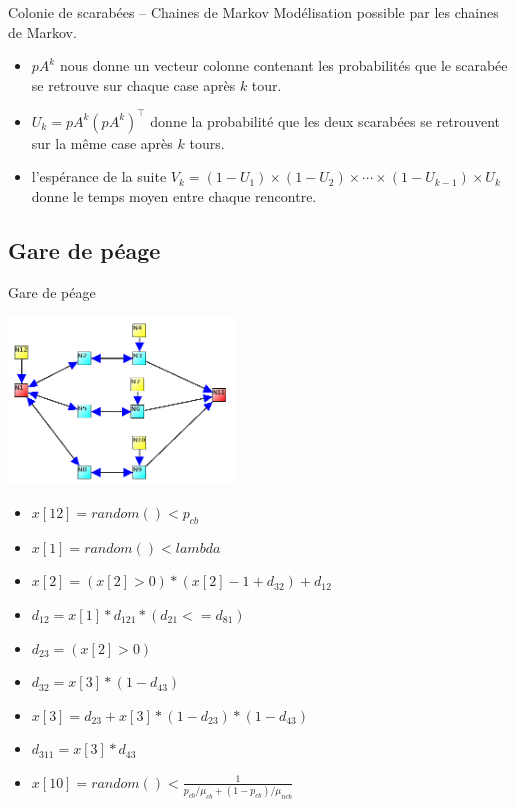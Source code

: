 \documentclass{beamer}
\begin{document}
  \begin{frame}{Colonie de scarabées -- Chaines de Markov}
    Modélisation possible par les chaines de Markov.

    \begin{itemize}
        \item $pA^k$ nous donne un vecteur colonne contenant les probabilités que le scarabée
            se retrouve sur chaque case après $k$ tour.
        \item $U_k = pA^k(pA^k)^\intercal$ donne la probabilité que les deux scarabées se retrouvent
            sur la même case après $k$ tours.
        \item l'espérance de la suite $V_k = (1 - U_1) \times (1 - U_2) \times \cdots \times (1 - U_{k - 1}) \times U_k$ donne le temps moyen entre chaque rencontre.
    \end{itemize}
  \end{frame}

\subsection{Gare de péage}
  \begin{frame}{Gare de péage}
    \begin{vwcol}[widths={0.6,0.4}, sep=.0cm, rule=0pt] 
      \includegraphics[width=6cm]{../../procstochs/img/3_files.png}

      \tiny
      \begin{itemize}
        \item $x[12] = random() < p_{cb}$
        \item $x[1] = random() < lambda$
        \item $x[2] =(x[2]>0)*(x[2]-1+d_{32})+d_{12}$
        \item $d_{12} = x[1]*d_{121}*(d_{21}<=d_{81})$
        \item $d_{23} = (x[2]>0)$
        \item $d_{32} = x[3]*(1-d_{43})$
        \item $x[3] = d_{23} + x[3]*(1-d_{23})*(1-d_{43})$
        \item $d_{311} = x[3]*d_{43}$
        \item $x[10] = random() < \frac 1 {p_{cb}/\mu_{cb}+(1-p_{cb})/\mu_{ncb}}$
      \end{itemize}
    \end{vwcol}
  \end{frame}
\end{document}
